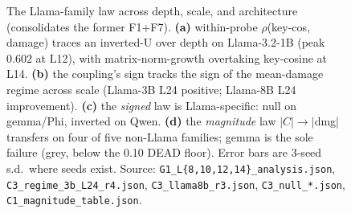 \begin{figure}[t]
\caption{The Llama-family law across depth, scale, and architecture (consolidates
the former F1+F7). \textbf{(a)} within-probe $\rho$(key-cos, damage) traces an
inverted-U over depth on Llama-3.2-1B (peak $0.602$ at L12), with matrix-norm-growth
overtaking key-cosine at L14. \textbf{(b)} the coupling's sign tracks the sign of the
mean-damage regime across scale (Llama-3B L24 positive; Llama-8B L24 improvement).
\textbf{(c)} the \emph{signed} law is Llama-specific: null on gemma/Phi, inverted on
Qwen. \textbf{(d)} the \emph{magnitude} law $|C|\!\to\!|$dmg$|$ transfers on four of five
non-Llama families; gemma is the sole failure (grey, below the 0.10 DEAD floor).
Error bars are 3-seed s.d.\ where seeds exist. Source:
\texttt{G1\_L\{8,10,12,14\}\_analysis.json}, \texttt{C3\_regime\_3b\_L24\_r4.json},
\texttt{C3\_llama8b\_r3.json}, \texttt{C3\_null\_*.json}, \texttt{C1\_magnitude\_table.json}.}
\label{fig:layerlaw}
\label{fig:crossarch}
\end{figure}
